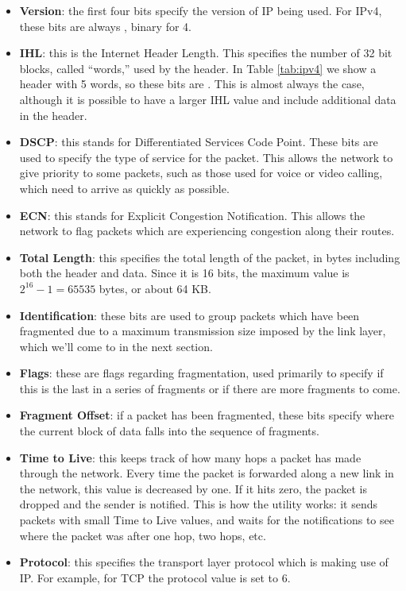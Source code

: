 \begin{itemize}
    \item \textbf{Version}: the first four bits specify the version of IP being used. For IPv4, these bits are always , binary for 4.
    \item \textbf{IHL}: this is the Internet Header Length. This specifies the number of 32 bit blocks, called ``words,'' used by the header. In Table \ref{tab:ipv4} we show a header with 5 words, so these bits are . This is almost always the case, although it is possible to have a larger IHL value and include additional data in the header.
    \item \textbf{DSCP}: this stands for Differentiated Services Code Point. These bits are used to specify the type of service for the packet. This allows the network to give priority to some packets, such as those used for voice or video calling, which need to arrive as quickly as possible.
    \item \textbf{ECN}: this stands for Explicit Congestion Notification. This allows the network to flag packets which are experiencing congestion along their routes.
    \item \textbf{Total Length}: this specifies the total length of the packet, in bytes including both the header and data. Since it is 16 bits, the maximum value is $2^{16}-1 = 65535$ bytes, or about 64 KB.
    \item \textbf{Identification}: these bits are used to group packets which have been fragmented due to a maximum transmission size imposed by the link layer, which we'll come to in the next section.
    \item \textbf{Flags}: these are flags regarding fragmentation, used primarily to specify if this is the last in a series of fragments or if there are more fragments to come.
    \item \textbf{Fragment Offset}: if a packet has been fragmented, these bits specify where the current block of data falls into the sequence of fragments.
    \item \textbf{Time to Live}: this keeps track of how many hops a packet has made through the network. Every time the packet is forwarded along a new link in the network, this value is decreased by one. If it hits zero, the packet is dropped and the sender is notified. This is how the  utility works: it sends packets with small Time to Live values, and waits for the notifications to see where the packet was after one hop, two hops, etc.
    \item \textbf{Protocol}: this specifies the transport layer protocol which is making use of IP. For example, for TCP the protocol value is set to 6.

\end{itemize}
